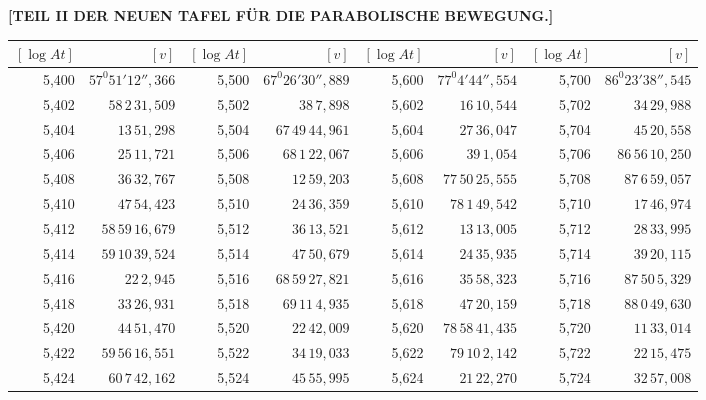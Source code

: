 \clearpage
{}
\begingroup
\centering
\fontsize{9}{9}\selectfont
\setlength{\tabcolsep}{1.25pt}
\renewcommand{\arraystretch}{.9}
\setlength{\parskip}{0pt}
\textbf{[TEIL II DER NEUEN TAFEL FÜR DIE PARABOLISCHE BEWEGUNG.]}
\par\vspace{7pt}
\begin{tabular}{|r|r||r|r||r|r||r|r|}
\hline
\([\log At]\) & \([v]\) & \([\log At]\) & \([v]\) & \([\log At]\) & \([v]\) & \([\log At]\) & \([v]\) \\
\hline
5,400 & \(57^{0}51'12'',\!366\) & 5,500 & \(67^{0}26'30'',\!889\) & 5,600 & \(77^{0}4'44'',\!554\) & 5,700 & \(86^{0}23'38'',\!545\) \\[1pt]
5,402 & \(58\,2\,31,\!509\) & 5,502 & \(38\,7,\!898\) & 5,602 & \(16\,10,\!544\) & 5,702 & \(34\,29,\!988\) \\
5,404 & \(13\,51,\!298\) & 5,504 & \(67\,49\,44,\!961\) & 5,604 & \(27\,36,\!047\) & 5,704 & \(45\,20,\!558\) \\
5,406 & \(25\,11,\!721\) & 5,506 & \(68\,1\,22,\!067\) & 5,606 & \(39\,1,\!054\) & 5,706 & \(86\,56\,10,\!250\) \\
5,408 & \(36\,32,\!767\) & 5,508 & \(12\,59,\!203\) & 5,608 & \(77\,50\,25,\!555\) & 5,708 & \(87\,6\,59,\!057\) \\
5,410 & \(47\,54,\!423\) & 5,510 & \(24\,36,\!359\) & 5,610 & \(78\,1\,49,\!542\) & 5,710 & \(17\,46,\!974\) \\[1pt]
5,412 & \(58\,59\,16,\!679\) & 5,512 & \(36\,13,\!521\) & 5,612 & \(13\,13,\!005\) & 5,712 & \(28\,33,\!995\) \\
5,414 & \(59\,10\,39,\!524\) & 5,514 & \(47\,50,\!679\) & 5,614 & \(24\,35,\!935\) & 5,714 & \(39\,20,\!115\) \\
5,416 & \(22\,2,\!945\) & 5,516 & \(68\,59\,27,\!821\) & 5,616 & \(35\,58,\!323\) & 5,716 & \(87\,50\,5,\!329\) \\
5,418 & \(33\,26,\!931\) & 5,518 & \(69\,11\,4,\!935\) & 5,618 & \(47\,20,\!159\) & 5,718 & \(88\,0\,49,\!630\) \\
5,420 & \(44\,51,\!470\) & 5,520 & \(22\,42,\!009\) & 5,620 & \(78\,58\,41,\!435\) & 5,720 & \(11\,33,\!014\) \\[1pt]
5,422 & \(59\,56\,16,\!551\) & 5,522 & \(34\,19,\!033\) & 5,622 & \(79\,10\,2,\!142\) & 5,722 & \(22\,15,\!475\) \\
5,424 & \(60\,7\,42,\!162\) & 5,524 & \(45\,55,\!995\) & 5,624 & \(21\,22,\!270\) & 5,724 & \(32\,57,\!008\) \\

\end{tabular}
